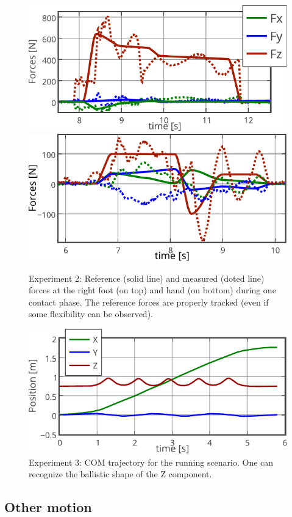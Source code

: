 \begin{figure}[!ht]
	\centering
	\includegraphics[width=0.9\linewidth]{./fig/Right_Foot_Forces.pdf}
	\includegraphics[width=0.85\linewidth]{./fig/Right_Hand_Forces.pdf}
		\caption{Experiment 2: Reference (solid line) and measured (doted line) forces at the right foot (on top) and hand (on bottom) during one contact phase. The reference forces are properly tracked (even if some flexibility can be observed).}
		\label{fig:foot_forces}
\end{figure}

\begin{figure}[!ht]
	\centering
	\includegraphics[width=0.8\linewidth]{./fig/running_traj.pdf}
		\caption{Experiment 3: COM trajectory for the running scenario. One can recognize the ballistic shape of the Z component.}
		\label{fig:running}
\end{figure}

\subsection{Other motion}

